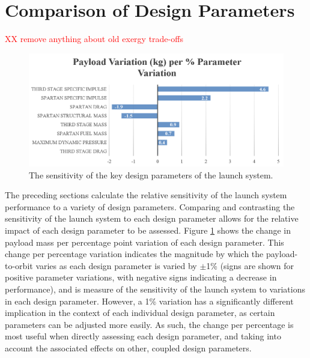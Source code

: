 \section{Comparison of Design Parameters}\label{sec:comparisonNoReturn}
\textcolor{red}{XX remove  anything about old exergy trade-offs}
\begin{figure}[ht!]
	\centering
	\includegraphics[width=0.99\linewidth]{figures/5_Ascent/BarChartRelativePayloadChange}
	\caption{The sensitivity of the key design parameters of the launch system.}
	\label{fig:BarChartRelativePayloadChange}
\end{figure}

The preceding sections calculate the relative sensitivity of the launch system performance to a variety of design parameters. 
Comparing and contrasting the sensitivity of the launch system to each design parameter allows for the relative impact of each design parameter to be assessed. 
Figure \ref{fig:BarChartRelativePayloadChange} shows the change in payload mass per percentage point variation of each design parameter. 
This change per percentage variation indicates the magnitude by which the payload-to-orbit varies as each design parameter is varied by $\pm$1\% (signs are shown for positive parameter variations, with negative signs indicating a decrease in performance), and is measure of the sensitivity of the launch system to variations in each design parameter. 
However, a 1\% variation has a significantly different implication in the context of each individual design parameter, as certain parameters can be adjusted more easily. 
As such, the change per percentage is most useful when directly assessing each design parameter, and taking into account the associated effects on other, coupled design parameters. 

